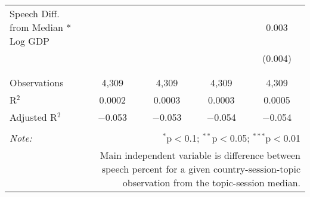\begin{table}[!htbp]
\begin{tabular}{@{\extracolsep{5pt}}lcccc}
 Speech Diff. from Median * Log GDP &  &  &  & 0.003 \\ 
  &  &  &  & (0.004) \\ 
  & & & & \\ 
\hline \\[-1.8ex] 
Observations & 4,309 & 4,309 & 4,309 & 4,309 \\ 
R$^{2}$ & 0.0002 & 0.0003 & 0.0003 & 0.0005 \\ 
Adjusted R$^{2}$ & $-$0.053 & $-$0.053 & $-$0.054 & $-$0.054 \\ 
\hline 
\hline \\[-1.8ex] 
\textit{Note:}  & \multicolumn{4}{r}{$^{*}$p$<$0.1; $^{**}$p$<$0.05; $^{***}$p$<$0.01} \\ 
 & \multicolumn{4}{r}{Main independent variable is difference between speech percent for a given country-session-topic observation from the topic-session median.} \\ 
\end{tabular} 
\end{table} 
